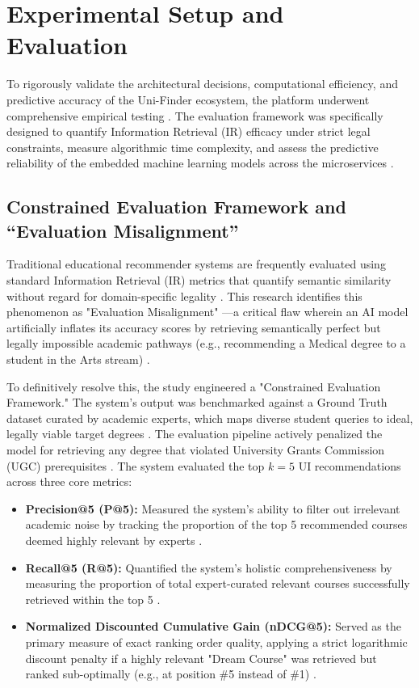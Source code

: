 \documentclass[conference]{IEEEtran}
\begin{document}
\section{Experimental Setup and Evaluation}

To rigorously validate the architectural decisions, computational efficiency, and predictive accuracy of the Uni-Finder ecosystem, the platform underwent comprehensive empirical testing \cite{silva2026systematic}. The evaluation framework was specifically designed to quantify Information Retrieval (IR) efficacy under strict legal constraints, measure algorithmic time complexity, and assess the predictive reliability of the embedded machine learning models across the microservices \cite{seu2024stream}.

\subsection{Constrained Evaluation Framework and ``Evaluation Misalignment''}
Traditional educational recommender systems are frequently evaluated using standard Information Retrieval (IR) metrics that quantify semantic similarity without regard for domain-specific legality \cite{seu2024stream}. This research identifies this phenomenon as "Evaluation Misalignment" ---a critical flaw wherein an AI model artificially inflates its accuracy scores by retrieving semantically perfect but legally impossible academic pathways (e.g., recommending a Medical degree to a student in the Arts stream) \cite{springer2024genai_sl}.

To definitively resolve this, the study engineered a "Constrained Evaluation Framework." The system's output was benchmarked against a Ground Truth dataset curated by academic experts, which maps diverse student queries to ideal, legally viable target degrees \cite{silva2026systematic}. The evaluation pipeline actively penalized the model for retrieving any degree that violated University Grants Commission (UGC) prerequisites \cite{seu2024stream}. The system evaluated the top $k=5$ UI recommendations across three core metrics:
\begin{itemize}
    \item \textbf{Precision@5 (P@5):} Measured the system's ability to filter out irrelevant academic noise by tracking the proportion of the top 5 recommended courses deemed highly relevant by experts \cite{silva2026systematic}.
    \item \textbf{Recall@5 (R@5):} Quantified the system's holistic comprehensiveness by measuring the proportion of total expert-curated relevant courses successfully retrieved within the top 5 \cite{silva2026systematic}.
    \item \textbf{Normalized Discounted Cumulative Gain (nDCG@5):} Served as the primary measure of exact ranking order quality, applying a strict logarithmic discount penalty if a highly relevant "Dream Course" was retrieved but ranked sub-optimally (e.g., at position \#5 instead of \#1) \cite{silva2026systematic}.
\end{itemize}
\end{document}
